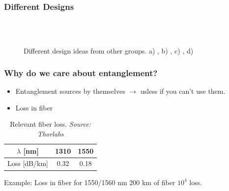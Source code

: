 \documentclass[serif,8pt]{beamer}
\begin{document}
{{\begin{frame}[t]
	\frametitle{Different Designs}
	\begin{figure}[!ht]
	  \centering
	  \caption{Different design ideas from other groups. a) \cite{design1}, b) \cite{design2}, c) \cite{design3}, d) \cite{design4}}
	  \quad
	  \\
	  \quad
	  \\
	  \label{fig:sub4}
	\end{figure}
\end{frame}

\begin{frame}[t]
	\frametitle{Why do we care about entanglement?}
	\begin{itemize}
		\item Entanglement sources by themselves $\rightarrow$ usless if you can't use them.
		\item Loss in fiber
	\end{itemize}
	\begin{table}
		\caption{Relevant fiber loss. \textit{Source: Thorlabs}}\label{tab:fiberloss}
		\begin{tabular}{|c|c|c|}
			\hline
			$\lambda$ [nm] & 1310 & 1550\\
			\hline
			Loss [dB/km] & 0.32 &  0.18\\
			\hline
		\end{tabular}
	\end{table}
	\begin{exampleblock}{Example: Loss in fiber for 1550/1560 nm}
		200 km of fiber \rightarrow $10^4$ loss.
	\end{exampleblock}
	

\end{frame}}}
\end{document}
